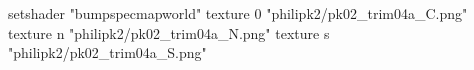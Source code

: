 setshader "bumpspecmapworld"
    texture 0 "philipk2/pk02_trim04a_C.png"
    texture n "philipk2/pk02_trim04a_N.png"
    texture s "philipk2/pk02_trim04a_S.png"